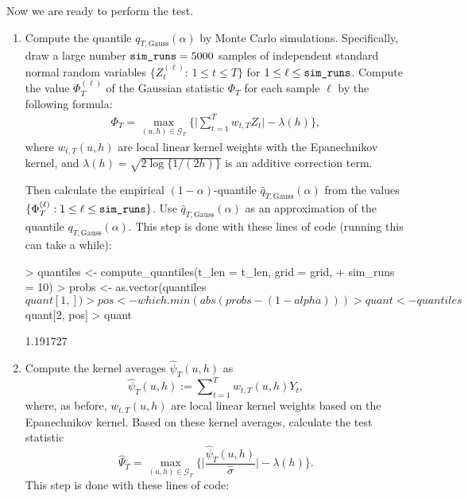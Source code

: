 \documentclass[a4paper]{scrartcl}
\begin{document}
Now we are ready to perform the test.
\begin{enumerate}[label=\textit{Step \arabic*.}, leftmargin=1.45cm]
  \item Compute the quantile $q_{T,\text{Gauss}}(\alpha)$ by Monte Carlo simulations. Specifically, draw a large number $\verb|sim_runs| = 5000$ samples of independent standard normal random variables $\{Z_{t}^{(\ell)} : \, 1 \le t \le T \}$ for $1 \le \ell \le \verb|sim_runs|$. Compute the value $\Phi_T^{(\ell)}$ of the Gaussian statistic $\Phi_T$ for each sample $\ell$ by the following formula:
\begin{align*}
\Phi_T = \max_{(u, h) \in \mathcal{G}_T}\bigg\{ \Big|\sum\limits_{t=1}^T w_{t, T} Z_{t}\Big| - \lambda(h) \bigg\},
\end{align*}
where $w_{t, T}(u, h)$ are local linear kernel weights with the Epanechnikov kernel, and $\lambda(h) = \sqrt{2 \log \{ 1/(2h) \}}$ is an additive correction term.

Then calculate the empirical $(1-\alpha)$-quantile $\widehat{q}_{T,\text{Gauss}}(\alpha)$ from the values $\{ \Phi_T^{(\ell)}: 1 \le \ell \le \verb|sim_runs| \}$. Use $\widehat{q}_{T,\text{Gauss}}(\alpha)$ as an approximation of the quantile $q_{T,\text{Gauss}}(\alpha)$.
This step is done with these lines of code (running this can take a while):

\begin{Schunk}
\begin{Sinput}
> quantiles <- compute_quantiles(t_len = t_len, grid = grid,
+                                sim_runs = 10)
> probs <- as.vector(quantiles$quant[1, ])
> pos   <- which.min(abs(probs - (1 - alpha)))
> quant <- quantiles$quant[2, pos]
> quant
\end{Sinput}
\begin{Soutput}
[1] 1.191727
\end{Soutput}
\end{Schunk}
  \item Compute the kernel averages $\widehat{\psi}_{T}(u, h)$ as
  \begin{equation*}
 \widehat{\psi}_{T}(u, h) := \sum\nolimits_{t=1}^T w_{t, T}(u, h) Y_{t},
\end{equation*}
where, as before, $w_{t, T}(u, h)$ are local linear kernel weights based on the Epanechnikov kernel. Based on these kernel averages, calculate the test statistic
$$\widehat{\Psi}_{T} = \max_{(u, h)\in \mathcal{G}_T} \bigg\{ \Big| \frac{\widehat{\psi}_{T}(u, h) }{\widehat{\sigma}}\Big| - \lambda(h) \Bigg\}.$$
This step is done with these lines of code:


\end{enumerate}
\end{document}
